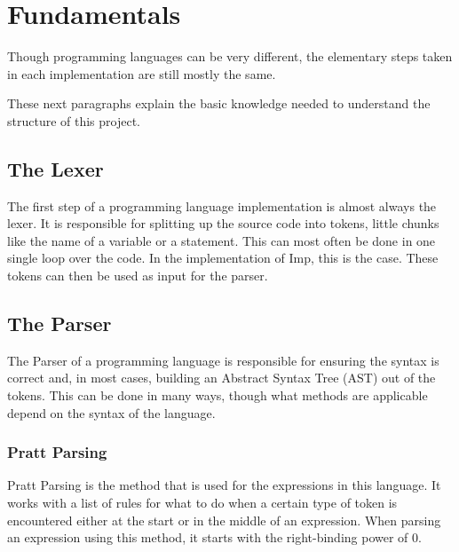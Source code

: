 \documentclass[12pt]{article}
\begin{document}
\section{Fundamentals}
Though programming languages can be very different,
the elementary steps taken in each implementation are
still mostly the same.

These next paragraphs explain the basic knowledge needed
to understand the structure of this project.

\subsection{The Lexer}
The first step of a programming language implementation is almost always the lexer.
It is responsible for splitting up the source code into tokens, little chunks like the name of a variable or a statement.
This can most often be done in one single loop over the code.
In the implementation of Imp, this is the case.
These tokens can then be used as input for the parser.

\subsection{The Parser}
The Parser of a programming language is responsible for ensuring the syntax is correct and, in most cases,
building an Abstract Syntax Tree (AST) out of the tokens.
This can be done in many ways, though what methods are applicable
depend on the syntax of the language.
\subsubsection{Pratt Parsing}
Pratt Parsing \autocite{prattTopOperatorPrecedence1973}
is the method that is used for the expressions in this language.
It works with a list of rules for what to do when a certain type of token is encountered
either at the start or in the middle of an expression.
When parsing an expression using this method,
it starts with the right-binding power of 0.
\end{document}
